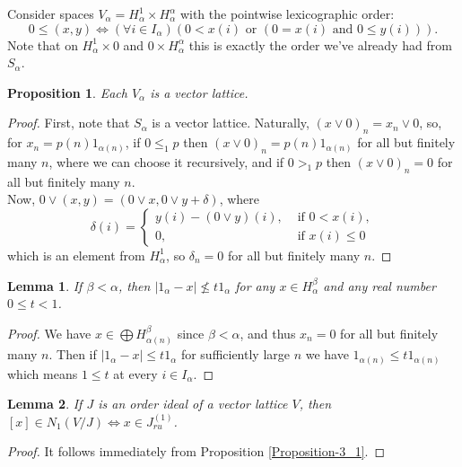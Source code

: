 \documentclass[10pt]{article}
\newtheorem{proposition}{Proposition}[section]
\newtheorem{lemma}{Lemma}[section]
\renewcommand{\a}{\alpha}
\renewcommand{\b}{\beta}
\begin{document}
\bigskip
Consider spaces $V_\a = H_\a^1 \times H_\a^\a$ with the pointwise lexicographic order:
$$
	0 \leqslant (x, y) \iff (\forall i \in I_\a)(0 < x(i) \text{ or } (0 = x(i) \text{ and } 0 \leqslant y(i))).
$$
Note that on $ H_\a^1 \times 0 $ and $ 0 \times H_\a^\a $ this is exactly the order we've already had from $ S_\a $.

\begin{proposition}\label{Proposition-4_1}
Each $ V_\a $ is a vector lattice.
\end{proposition}

\begin{proof}
First, note that $ S_\a $ is a vector lattice. Naturally, $ (x \lor 0)_n = x_n \lor 0 $, so, for $ x_n = p(n)1_{\a(n)} $, 
if $ 0 \leqslant_1 p $ then $ (x \lor 0)_n = p(n)1_{\a(n)} $ for all but finitely many $ n $, 
where we can choose it recursively, and if $ 0 >_1 p $ then $ (x \lor 0)_n = 0 $ for all but finitely many $ n $.
\\
Now, $ 0 \lor (x, y) = (0 \lor x, 0 \lor y + \delta) $, where
$$
\delta(i) =
\begin{cases}
	y(i) - (0 \lor y)(i), & \text{ if } 0 < x(i), \\
	0, & \text{ if } x(i) \leqslant 0
\end{cases}
$$
which is an element from $ H_\a^1 $, so $ \delta_n = 0 $ for all but finitely many $ n $.
\end{proof}

\begin{lemma}\label{there_is_gap}
If $ \b < \a $, then $| 1_\a - x | \not\leqslant t 1_\a$ for any $ x \in H_\a^\b $ and any real number $ 0 \leqslant t < 1 $.
\end{lemma}

\begin{proof}
We have $ x \in \bigoplus H_{\a(n)}^\b $ since $ \b < \a $, and thus $ x_n = 0 $ for all but finitely many $ n $. 
Then if $ | 1_\a - x | \leqslant t 1_\a $ for sufficiently large $ n $ we have $ 1_{\a(n)} \leqslant t 1_{\a(n)} $ which means $ 1 \leqslant t $ at every $ i \in I_\a $.
\end{proof}

\begin{lemma}\label{ru_is_inf}
If $J$  is an order ideal of a vector lattice $V$, then $[x] \in N_1(V/J) 	\iff  x \in {J}_{ru}^{(1)}$.
\end{lemma}

\begin{proof}
It follows immediately from Proposition \ref{Proposition-3_1}.
\end{proof}
\end{document}
